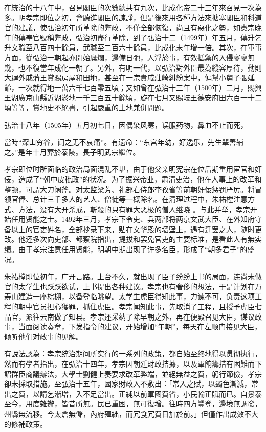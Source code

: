 在統治的十八年中，召見閣臣的次數總共有九次，比成化帝二十三年來召見一次為多。明孝宗即位之初，會聽進閣臣的諫諍，但是後來用各種方法來搪塞閣臣和科道官的建議，使弘治初年所革除的弊政，不僅全部恢復，尚且有惡化之勢，如憲宗晚年的傳奉官號稱弊政，弘治初盡行革除，到了弘治十二（1499年）年五月，傳升乞升文職至八百四十餘員，武職至二百六十餘員，比成化末年增一倍。其次，在軍事方面，從弘治一朝起亦開始糜爛，邊備日弛，人浮於事，有效抵禦的入侵寥寥無幾，也不復當年成化一朝了。另外，有明一代，以弘治對外臣最為縱容厚待，動則大肆外戚藩王賞賜房屋和田地，甚至在一宗貴戚莊崎糾紛案中，偏幫小舅子張延齡，一次就得地一萬六千七百零五頃；又如曾在弘治十三年（1500年）二月，賜興王湖廣京山縣近湖淤地一千三百五十餘頃，旋在七月又賜岐王德安府田六百一十二頃等等，賞地史不絕書，引起嚴重的土地兼併問題。

弘治十八年（1505年）五月初七日，因偶染风寒，误服药物，鼻血不止而死，

當時“深山穷谷，闻之无不哀痛”。有遗命：“东宫年幼，好逸乐，先生辈善辅之。”是年十月葬於泰陵。長子明武宗繼位。

孝宗即位时所面临的政治局面混乱不堪，由于他父亲明宪宗在位后期重用宦官和奸佞，造成了“朝中皮秕政”的状况。为了振兴帝业，肃清吏治，他在人事上的改革和整顿，可謂大刀阔斧。对太监梁芳、礼部右侍郎李孜省等前朝奸佞惩罚严厉。将冒领官俸、总计三千多人的艺人、僧徒等一概除名。在清理过程中，朱祐樘注意方式、方法，没有大开杀戒，斬殺的只有罪大恶极的僧人继晓 。与此并举，孝宗开始任用贤能之士。1492年三月，孝宗下令吏、兵两部将两京文武大臣、在外知府守备以上的官吏姓名，全部抄录下来，贴在文华殿的墙壁上，遇有迁罢之人，随时更改。他还多次向吏部、都察院指出，提拔和罢免官吏的主要标准，是看此人有無实绩。由于孝宗注意任用贤能，明朝中期出现了许多名臣，形成了“朝多君子”的盛况。

朱祐樘即位初年，广开言路。上台不久，就出现了臣子纷纷上书的局面，连尚未做官的太学生也跃跃欲试，上书提出各种建议。孝宗也有奢侈的想法，于是计划在万寿山建造一座棕棚，以备登临眺望。太学生虎臣得知此事，力谏不可，负责这项工程的朝中官员担心獲罪，抓住虎臣。孝宗闻知此事，先取消了工程，且授予虎臣七品官，派往云南做了知县。孝宗还采纳了除早朝之外，再在便殿召见大臣，谋议政事，当面阅读奏章，下发指令的建议，开始增加“午朝”，每天在左顺门接见大臣，倾听他们对政事的见解。

有說法認為：孝宗统治期间所实行的一系列的政策，都自始至终地得以贯彻执行，然而有學者指出，在弘治十四年，孝宗因朝廷財政拮據，以及軍餉籌措有困難而下詔群臣商議辦法，大學士劉健上奏要求改革弊端，並絕無益之費，躬行節儉，孝宗卻未採取措施。至弘治十五年，國家財政入不敷出：「常入之賦，以蠲色漸減，常出之費，以請乞漸增，入不足當出。正純以前軍國費省，小民輸正賦而已。自景泰至今，用度雜辦，皆昔所無。民已重困，無可復增。往時四方豐登，邊境無調發，州縣無流移。今太倉無儲，內府殫絀，而冗食冗費日加於前。」但僅作出成效不大的修補政策。

